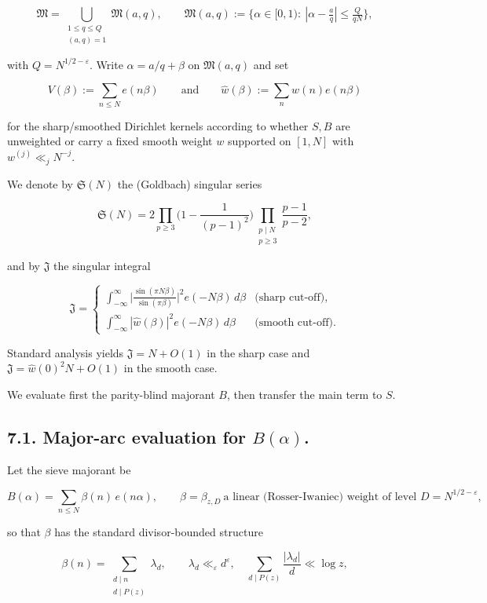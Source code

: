 \documentclass[11pt]{article}
\theoremstyle{definition}
\theoremstyle{remark}
\begin{document}
$$
\mathfrak M=\bigcup_{\substack{1\le q\le Q\\(a,q)=1}}\mathfrak M(a,q),\qquad 
\mathfrak M(a,q):=\{\alpha\in[0,1):\ |\alpha-\tfrac aq|\le \tfrac{Q}{qN}\},
$$

with $Q=N^{1/2-\varepsilon}$. Write $\alpha=a/q+\beta$ on $\mathfrak M(a,q)$ and set

$$
V(\beta):=\sum_{n\le N}e(n\beta) \qquad\text{and}\qquad \widehat w(\beta):=\sum_{n}w(n)e(n\beta)
$$

for the sharp/smoothed Dirichlet kernels according to whether $S, B$ are unweighted or carry a fixed smooth weight $w$ supported on $[1,N]$ with $w^{(j)}\ll_j N^{-j}$.

We denote by $\mathfrak S(N)$ the (Goldbach) singular series

$$
\mathfrak S(N)=2\prod_{p\ge 3}\Big(1-\frac1{(p-1)^2}\Big)
\prod_{\substack{p\mid N\\ p\ge 3}}\frac{p-1}{p-2},
$$

and by $\mathfrak J$ the singular integral

$$
\mathfrak J=
\begin{cases}
\displaystyle \int_{-\infty}^{\infty}\Big|\frac{\sin(\pi N\beta)}{\sin(\pi\beta)}\Big|^{\!2}e(-N\beta)\,d\beta
&\text{(sharp cut-off)},\\[2ex]
\displaystyle \int_{-\infty}^{\infty}|\widehat w(\beta)|^{2}e(-N\beta)\,d\beta
&\text{(smooth cut-off)}.
\end{cases}
$$

Standard analysis yields $\mathfrak J=N+O(1)$ in the sharp case and $\mathfrak J=\widehat w(0)^2 N+O(1)$ in the smooth case.

We evaluate first the parity-blind majorant $B$, then transfer the main term to $S$.

\subsection*{7.1. Major-arc evaluation for $B(\alpha)$.}

Let the sieve majorant be

$$
B(\alpha)=\sum_{n\le N}\beta(n)\,e(n\alpha),\qquad 
\beta=\beta_{z,D}\ \text{a linear (Rosser-Iwaniec) weight of level }D=N^{1/2-\varepsilon},
$$

so that $\beta$ has the standard divisor-bounded structure

$$
\beta(n)=\sum_{\substack{d\mid n\\ d\mid P(z)}}\lambda_d,\qquad 
\lambda_d\ll_\varepsilon d^\varepsilon,\quad \sum_{d\mid P(z)}\frac{|\lambda_d|}{d}\ll \log z,
$$
\end{document}
